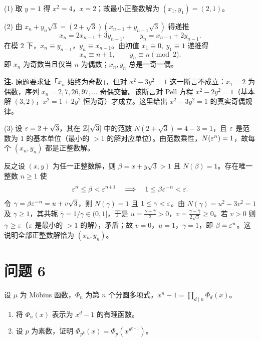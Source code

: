 \documentclass{article}
\begin{document}
\begin{solution}
  (1) 取 $y=1$ 得 $x^2=4$，$x=2$；故最小正整数解为 $(x_1,y_1)=(2,1)$。

  (2) 由 $x_n+y_n\sqrt3=(2+\sqrt3)(x_{n-1}+y_{n-1}\sqrt3)$ 得递推
  \[
    x_n=2x_{n-1}+3y_{n-1},\qquad y_n=x_{n-1}+2y_{n-1}.
  \]
  在模 $2$ 下，$x_n\equiv y_{n-1}$，$y_n\equiv x_{n-1}$。由初值 $x_1\equiv 0,\ y_1\equiv 1$ 递推得
  \[
    x_n\equiv n+1,\qquad y_n\equiv n\pmod 2 .
  \]
  即 $x_n$ 为奇数当且仅当 $n$ 为偶数；$x_n,y_n$ 总是一奇一偶。

  \textbf{注.} 原题要求证「$x_n$ 始终为奇数」，但对 $x^2-3y^2=1$ 这一断言不成立：$x_1=2$ 为偶数，序列 $x_n=2,7,26,97,\dots$ 奇偶交替。该断言对 Pell 方程 $x^2-2y^2=1$（基本解 $(3,2)$，$x^2=1+2y^2$ 恒为奇）才成立。这里给出 $x^2-3y^2=1$ 的真实奇偶规律。

  (3) 设 $\varepsilon=2+\sqrt3$，其在 $\mathbb{Z}[\sqrt3]$ 中的范数 $N(2+\sqrt3)=4-3=1$，且 $\varepsilon$ 是范数为 $1$ 的基本单位（最小的 $>1$ 的解对应单位）。由范数乘性，$N(\varepsilon^n)=1$，故每个 $(x_n,y_n)$ 都是正整数解。

  反之设 $(x,y)$ 为任一正整数解，则 $\beta=x+y\sqrt3>1$ 且 $N(\beta)=1$。存在唯一整数 $n\ge1$ 使
  \[
    \varepsilon^n\le \beta<\varepsilon^{n+1}\quad\Longrightarrow\quad 1\le \beta\varepsilon^{-n}<\varepsilon .
  \]
  令 $\gamma=\beta\varepsilon^{-n}=u+v\sqrt3$，则 $N(\gamma)=1$ 且 $1\le\gamma<\varepsilon$。由 $N(\gamma)=u^2-3v^2=1$ 及 $\gamma\ge1$，其共轭 $\bar\gamma=1/\gamma\in(0,1]$，于是 $u=\tfrac{\gamma+\bar\gamma}2>0$，$v=\tfrac{\gamma-\bar\gamma}{2\sqrt3}\ge0$。若 $v>0$ 则 $\gamma\ge \varepsilon$（$\varepsilon$ 是最小的 $>1$ 的解），矛盾；故 $v=0$，$u=1$，$\gamma=1$，即 $\beta=\varepsilon^n$。这说明全部正整数解恰为 $(x_n,y_n)$。
\end{solution}

\section{问题 6}

设 $\mu$ 为 Möbius 函数，$\Phi_n$ 为第 $n$ 个分圆多项式，$x^n-1=\prod_{d\mid n}\Phi_d(x)$。

\begin{enumerate}[(1)]
  \item 将 $\Phi_n(x)$ 表示为 $x^d-1$ 的有理函数。
  \item 设 $p$ 为素数，证明 $\Phi_{p^k}(x)=\Phi_p\!\left(x^{p^{k-1}}\right)$。
\end{enumerate}
\end{document}
